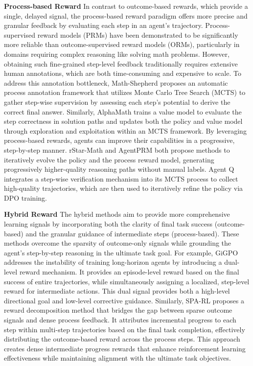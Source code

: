       
\textbf{Process-based Reward}
In contrast to outcome-based rewards, which provide a single, delayed signal, the process-based reward paradigm offers more precise and granular feedback by evaluating each step in an agent’s trajectory.
Process-supervised reward models (PRMs) have been demonstrated to be significantly more reliable than outcome-supervised reward models (ORMs), particularly in domains requiring complex reasoning like solving math problems\citep{lightman2023let}.
However, obtaining such fine-grained step-level feedback traditionally requires extensive human annotations, which are both time-consuming and expensive to scale.
To address this annotation bottleneck, Math-Shepherd\citep{wang2023math} proposes an automatic process annotation framework that utilizes Monte Carlo Tree Search (MCTS) to gather step-wise supervision by assessing each step’s potential to derive the correct final answer. Similarly, AlphaMath\citep{chen2024alphamath} trains a value model to evaluate the step correctness in solution paths and updates both the policy and value model through exploration and exploitation within an MCTS framework.
By leveraging process-based rewards, agents can improve their capabilities in a progressive, step-by-step manner.
rStar-Math\citep{guan2025rstar} and AgentPRM\citep{choudhury2025process} both propose methods to iteratively evolve the policy and the process reward model, generating progressively higher-quality reasoning paths without manual labels. Agent Q\citep{putta2024agentq} integrates a step-wise verification mechanism into its MCTS process to collect high-quality trajectories, which are then used to iteratively refine the policy via DPO training. 

\textbf{Hybrid Reward}
The hybrid methods aim to provide more comprehensive learning signals by incorporating both the clarity of final task success (outcome-based) and the granular guidance of intermediate steps (process-based). These methods overcome the sparsity of outcome-only signals while grounding the agent’s step-by-step reasoning in the ultimate task goal.
For example, GiGPO\citep{feng2025group} addresses the instability of training long-horizon agents by introducing a dual-level reward mechanism. It provides an episode-level reward based on the final success of entire trajectories, while simultaneously assigning a localized, step-level reward for intermediate actions. This dual signal provides both a high-level directional goal and low-level corrective guidance.
Similarly, SPA-RL\citep{wang2025spa} proposes a reward decomposition method that bridges the gap between sparse outcome signals and dense process feedback. It attributes incremental progress to each step within multi-step trajectories based on the final task completion, effectively distributing the outcome-based reward across the process steps. This approach creates dense intermediate progress rewards that enhance reinforcement learning effectiveness while maintaining alignment with the ultimate task objectives.







